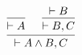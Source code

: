 \documentclass[12pt]{standalone}
\begin{document}
$$
\begin{prooftree}
    \infer0{ \vdash A }
    \hypo{ \vdash B } \infer1{ \vdash B, C }
    \infer2{ \vdash A\wedge B, C }
\end{prooftree}
$$
\end{document}
